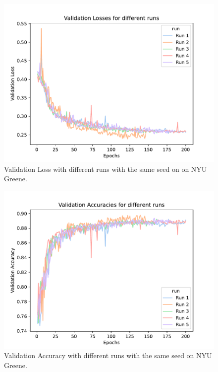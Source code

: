 \documentclass[sigplan,screen]{acmart}
\begin{document}
\begin{figure}[htb]
\centering\includegraphics[width=1.0\columnwidth]{images/validation_loss_diff_runs.pdf}
\caption{Validation Loss with different runs with the same seed on on NYU Greene.}
\label{fig:Validation loss}
\end{figure}

\begin{figure}[htb]
\centering\includegraphics[width=1.0\columnwidth]{images/validation_accuracy_diff_runs.pdf}
\caption{Validation Accuracy with different runs with the same seed on NYU Greene.}
\label{fig:Validation Accuracy}
\end{figure}
\end{document}
